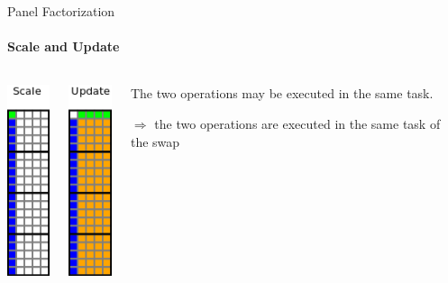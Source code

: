 \begin{frame}{Panel Factorization}
\framesubtitle{Scale and Update}
\begin{columns}
\begin{column}{.25\textwidth}
\begin{center}
\includegraphics[scale=0.8]{panel_scale.png}
\end{center}
\end{column}
\hfill
\begin{column}{.25\textwidth}
\begin{center}
\includegraphics[scale=0.8]{panel_update.png}
\end{center}
\end{column}
\hfill
\begin{column}{.50\textwidth}
The two operations may be executed in the same task.
\begin{center}
\begin{exampleblock}{}
$\Longrightarrow$ the two operations are executed in the same task of the swap
\end{exampleblock}{}
\end{center}
\end{column}
\end{columns}
\end{frame}

